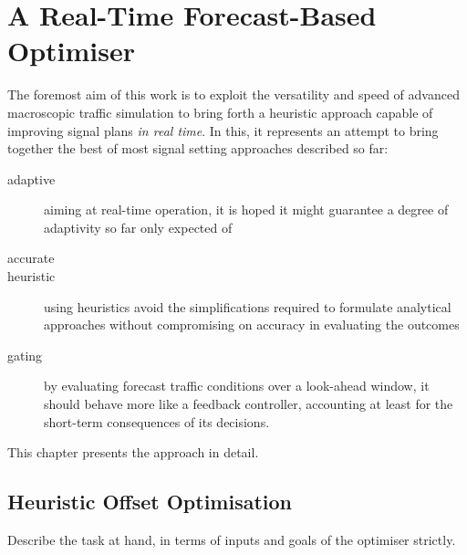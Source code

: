 \chapter{A Real-Time Forecast-Based Optimiser} \label{c:optimiser}

The foremost aim of this work is to exploit the versatility and speed of advanced macroscopic traffic simulation to bring forth a heuristic approach capable of improving signal plans \emph{in real time}.
In this, it represents an attempt to bring together the best of most signal setting approaches described so far:
\begin{description}
\item[adaptive] aiming at real-time operation, it is hoped it might guarantee a degree of adaptivity so far only expected of 
\item[accurate] 
\item[heuristic] using heuristics avoid the simplifications required to formulate analytical approaches without compromising on accuracy in evaluating the outcomes
\item[gating] by evaluating forecast traffic conditions over a look-ahead window, it should behave more like a feedback controller, accounting at least for the short-term consequences of its decisions.
\end{description}

This chapter presents the approach in detail.



\section{Heuristic Offset Optimisation}
Describe the task at hand, in terms of inputs and goals of the optimiser strictly.


